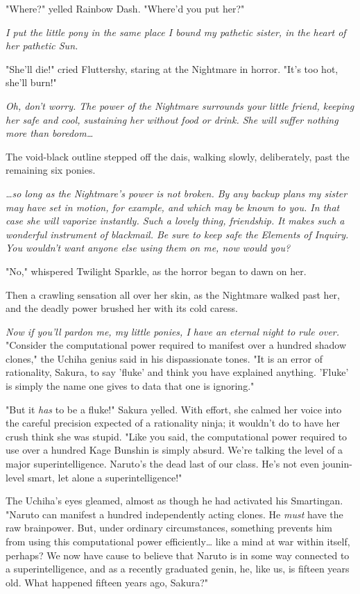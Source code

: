 "Where?" yelled Rainbow Dash. "Where'd you put her?"

\emph{I put the little pony in the same place I bound my pathetic sister, in 
the heart of her pathetic Sun.}

"She'll die!" cried Fluttershy, staring at the Nightmare in horror. "It's too 
hot, she'll burn!"

\emph{Oh, don't worry. The power of the Nightmare surrounds your little friend, 
keeping her safe and cool, sustaining her without food or drink. She will 
suffer nothing more than boredom{\ldots}}

The void-black outline stepped off the dais, walking slowly, deliberately, past 
the remaining six ponies.

\emph{{\ldots}so long as the Nightmare's power is not broken. By any backup 
plans my sister may have set in motion, for example, and which may be known to 
you. In that case she will vaporize instantly. Such a lovely thing, friendship. 
It makes such a wonderful instrument of blackmail. Be sure to keep safe the 
Elements of Inquiry. You wouldn't want anyone else using them on me, now would 
you?}

"No," whispered Twilight Sparkle, as the horror began to dawn on her.

Then a crawling sensation all over her skin, as the Nightmare walked past her, 
and the deadly power brushed her with its cold caress.

\emph{Now if you'll pardon me, my little ponies, I have an eternal night to 
rule over.}
\sbreak
"Consider the computational power required to manifest over a hundred shadow 
clones," the Uchiha genius said in his dispassionate tones. "It is an error of 
rationality, Sakura, to say 'fluke' and think you have explained anything. 
'Fluke' is simply the name one gives to data that one is ignoring."

"But it \emph{has} to be a fluke!" Sakura yelled. With effort, she calmed her 
voice into the careful precision expected of a rationality ninja; it wouldn't 
do to have her crush think she was stupid. "Like you said, the computational 
power required to use over a hundred Kage Bunshin is simply absurd. We're 
talking the level of a major superintelligence. Naruto's the dead last of our 
class. He's not even jounin-level smart, let alone a superintelligence!"

The Uchiha's eyes gleamed, almost as though he had activated his Smartingan. 
"Naruto can manifest a hundred independently acting clones. He \emph{must} have 
the raw brainpower. But, under ordinary circumstances, something prevents him 
from using this computational power efficiently{\ldots} like a mind at war 
within itself, perhaps? We now have cause to believe that Naruto is in some way 
connected to a superintelligence, and as a recently graduated genin, he, like 
us, is fifteen years old. What happened fifteen years ago, Sakura?"

